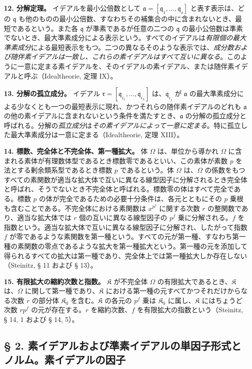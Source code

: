 \documentclass[11pt]{article}
\providecommand{\frakq}{\mathfrak q}
\providecommand{\frakr}{\mathfrak r}
\providecommand{\fraka}{\mathfrak a}
\providecommand{\frK}{\mathfrak K}
\providecommand{\frakq}{\mathfrak q}
\begin{document}
\textbf{12. 分解定理。} イデアルを最小公倍数として $\fraka=[\frakq_1,\ldots,\frakq_s]$ と表す表示は、どの $\frakq$ も他のものの最小公倍数、すなわちその補集合の中に含まれないとき、最短であるという。また各 $\frakq$ が準素であるが任意の二つの $\frakq$ の最小公倍数は準素でないとき、最大準素成分による表示という。すべてのイデアルは\emph{有限個の最大準素成分}による最短表示をもつ。二つの異なるそのような表示では、\emph{成分数および随伴素イデアルは一致し、これらの素イデアルはすべて互いに異なる}。このように一意に定まる素イデアルを、そのイデアルの素イデアル、または随伴素イデアルと呼ぶ（Idealtheorie, 定理 IX）。

\textbf{13. 分解の孤立成分。} イデアル $\frakr=[\frakq_{i_1},\ldots,\frakq_{i_\lambda}]$ は、$\frakq_{i_j}$ が $\fraka$ の最大準素成分による少なくとも一つの最短表示に現れ、かつそれらの随伴素イデアルのどれも $\fraka$ の他の素イデアルに含まれないという条件を満たすとき、$\fraka$ の分解の孤立成分と呼ばれる。分解の\emph{孤立成分}は\emph{その素イデアルによって一意に定まる}。特に孤立した最大準素成分は一意に定まる（Idealtheorie, 定理 XIII）。

\textbf{14. 標数、完全体と不完全体、第一種拡大。} 体 $\Omega$ は、単位から導かれ $\Omega$ に含まれる素体が有理数体型であるとき標数零であるといい、この素体が素数 $p$ を法とする剰余類系型であるとき標数 $p$ であるという。体 $\Omega$ は、$\Omega$ の係数をもつすべての素関数が適当な拡大体で互いに異なる線型因子に分解されるとき完全体と呼ばれ、そうでないとき不完全体と呼ばれる。標数零の体はすべて完全である。標数 $p$ の体が完全であるための必要十分条件は、各元とともにその $p$ 乗根も含むことである。不完全体における素関数は $x^{p^f}$ に関する次数 $r$ の整関数であり、適当な拡大体では $r$ 個の互いに異なる線型因子の $p^f$ 乗に分解される。$f$ を指数という。適当な拡大体で互いに異なる線型因子に分解され、したがって指数 $f$ が零であるような\mbox{素関数}を第一種という。すべての元が第一種、すなわち第一種の素関数の零点であるような拡大を第一種拡大という。第一種の元を添加して得られるすべての拡大は第一種であり、完全体上では第一種拡大しか存在しない（Steinitz, § 11 および § 13）。

\textbf{15. 有限拡大の縮約次数と指数。} $\frK$ が不完全体 $\Omega$ の有限拡大であるとき、$\frK$ は、$\Omega$ に関して第一種であり、$\frK$ における第一種の元すべてかつそれだけからなる次数 $r$ の部分体 $\frK_0$ を含む。$\frK$ の各元の $p^f$ 乗は $\frK_0$ に属し、$\frK$ にはちょうど次数 $rp^f$ の元が存在する。$r$ を縮約次数、$f$ を有限拡大の指数という（Steinitz, § 14, 1 および § 14, 5）。

\subsection*{§ 2. 素イデアルおよび準素イデアルの単因子形式とノルム。素イデアルの因子}
\end{document}
